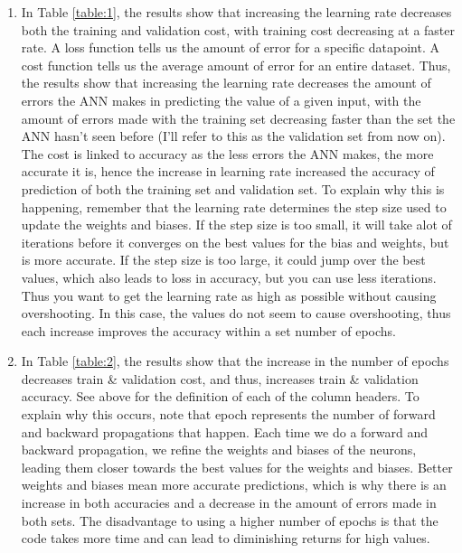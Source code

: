 \documentclass[12pt]{article}
\begin{document}
\begin{enumerate}
    \item In Table \ref{table:1}, the results show that increasing the learning rate decreases both the training and validation cost, with training cost decreasing at a faster rate. A loss function tells us the amount of error for a specific datapoint. A cost function tells us the average amount of error for an entire dataset. Thus, the results show that increasing the learning rate decreases the amount of errors the ANN makes in predicting the value of a given input, with the amount of errors made with the training set decreasing faster than the set the ANN hasn't seen before (I'll refer to this as the validation set from now on). The cost is linked to accuracy as the less errors the ANN makes, the more accurate it is, hence the increase in learning rate increased the accuracy of prediction of both the training set and validation set. To explain why this is happening, remember that the learning rate determines the step size used to update the weights and biases. If the step size is too small, it will take alot of iterations before it converges on the best values for the bias and weights, but is more accurate. If the step size is too large, it could jump over the best values, which also leads to loss in accuracy, but you can use less iterations. Thus you want to get the learning rate as high as possible without causing overshooting. In this case, the values do not seem to cause overshooting, thus each increase improves the accuracy within a set number of epochs.
    \item In Table \ref{table:2}, the results show that the increase in the number of epochs decreases train \& validation cost, and thus, increases train \& validation accuracy. See above for the definition of each of the column headers. To explain why this occurs, note that epoch represents the number of forward and backward propagations that happen. Each time we do a forward and backward propagation, we refine the weights and biases of the neurons, leading them closer towards the best values for the weights and biases. Better weights and biases mean more accurate predictions, which is why there is an increase in both accuracies and a decrease in the amount of errors made in both sets. The disadvantage to using a higher number of epochs is that the code takes more time and can lead to diminishing returns for high values.

\end{enumerate}
\end{document}
